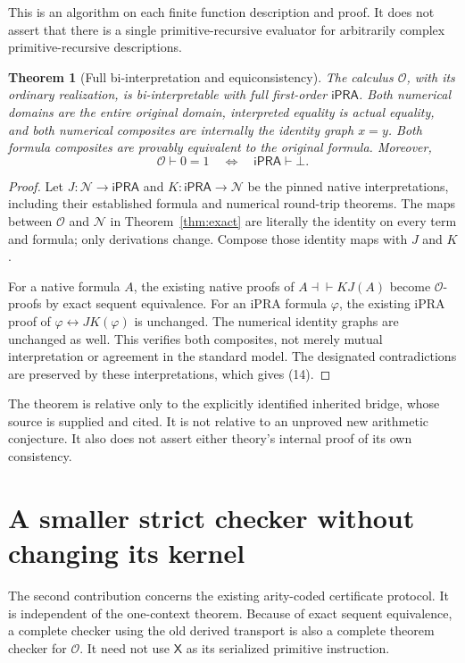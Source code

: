 \documentclass[11pt,letterpaper]{article}
\newtheorem{theorem}{Theorem}[section]
\theoremstyle{definition}\newtheorem{definition}[theorem]{Definition}
\theoremstyle{remark}\newtheorem{remark}[theorem]{Remark}
\newcommand{\N}{\mathcal N}
\newcommand{\Ocal}{\mathcal O}
\newcommand{\ipra}{\mathsf{iPRA}}
\newcommand{\One}{\mathsf X}
\begin{document}
This is an algorithm on each finite function description and proof. It
does not assert that there is a single primitive-recursive evaluator for
arbitrarily complex primitive-recursive descriptions.

\begin{theorem}[Full bi-interpretation and equiconsistency]
The calculus \(\Ocal\), with its ordinary realization, is
bi-interpretable with full first-order \(\ipra\). Both numerical domains
are the entire original domain, interpreted equality is actual equality,
and both numerical composites are internally the identity graph \(x=y\).
Both formula composites are provably equivalent to the original formula.
Moreover,
\[
 \Ocal\vdash 0=1\quad\Longleftrightarrow\quad\ipra\vdash\bot.
 \tag{14}
\]
\end{theorem}
\begin{proof}
Let \(J:\N\to\ipra\) and \(K:\ipra\to\N\) be the pinned native
interpretations, including their established formula and numerical
round-trip theorems. The maps between \(\Ocal\) and \(\N\) in
Theorem~\ref{thm:exact} are literally the identity on every term and
formula; only derivations change. Compose those identity maps with
\(J\) and \(K\).

For a native formula \(A\), the existing native proofs of
\(A\dashv\vdash KJ(A)\) become \(\Ocal\)-proofs by exact sequent
equivalence. For an iPRA formula \(\varphi\), the existing iPRA proof of
\(\varphi\leftrightarrow JK(\varphi)\) is unchanged. The numerical
identity graphs are unchanged as well. This verifies both composites,
not merely mutual interpretation or agreement in the standard model.
The designated contradictions are preserved by these interpretations,
which gives (14).
\end{proof}

The theorem is relative only to the explicitly identified inherited
bridge, whose source is supplied and cited. It is not relative to an
unproved new arithmetic conjecture. It also does not assert either
theory's internal proof of its own consistency.

\section{A smaller strict checker without changing its kernel}
\label{sec:scope}
The second contribution concerns the existing arity-coded certificate
protocol. It is independent of the one-context theorem. Because of exact
sequent equivalence, a complete checker using the old derived transport
is also a complete theorem checker for \(\Ocal\). It need not use
\(\One\) as its serialized primitive instruction.
\end{document}

